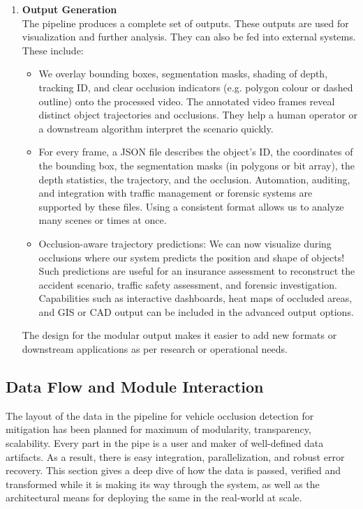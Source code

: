 \documentclass[12pt,a4paper]{report}
\theoremstyle{definition}
\theoremstyle{remark}
\begin{document}
\begin{enumerate}
    \item \textbf{Output Generation}\\
    The pipeline produces a complete set of outputs. These outputs are used for visualization and further analysis. They can also be fed into external systems. These include:
\begin{itemize}
\item We overlay bounding boxes, segmentation masks, shading of depth, tracking ID, and clear occlusion indicators (e.g. polygon colour or dashed outline) onto the processed video. The annotated video frames reveal distinct object trajectories and occlusions. They help a human operator or a downstream algorithm interpret the scenario quickly.
\item For every frame, a JSON file describes the object’s ID, the coordinates of the bounding box, the segmentation masks (in polygons or bit array), the depth statistics, the trajectory, and the occlusion. Automation, auditing, and integration with traffic management or forensic systems are supported by these files. Using a consistent format allows us to analyze many scenes or times at once. 
\item Occlusion-aware trajectory predictions: We can now visualize during occlusions where our system predicts the position and shape of objects! Such predictions are useful for an insurance assessment to reconstruct the accident scenario, traffic safety assessment, and forensic investigation. Capabilities such as interactive dashboards, heat maps of occluded areas, and GIS or CAD output can be included in the advanced output options.
\end{itemize}
The design for the modular output makes it easier to add new formats or downstream applications as per research or operational needs.

\end{enumerate}


\subsection{Data Flow and Module Interaction}
The layout of the data in the pipeline for vehicle occlusion detection for mitigation has been planned for maximum of modularity, transparency, scalability. Every part in the pipe is a user and maker of well-defined data artifacts. As a result, there is easy integration, parallelization, and robust error recovery. This section gives a deep dive of how the data is passed, verified and transformed while it is making its way through the system, as well as the architectural means for deploying the same in the real-world at scale.
\end{document}
